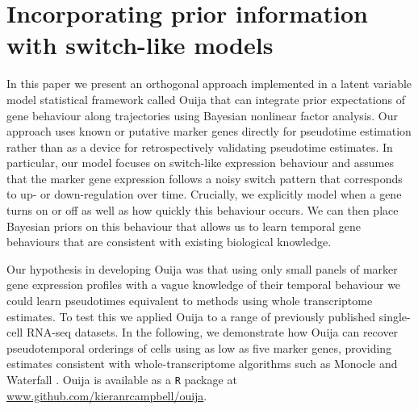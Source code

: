 \chapter{Incorporating prior information with switch-like models}\label{ch:ouijachap} %


In this paper we present an orthogonal approach implemented in a latent variable model statistical framework called Ouija that can integrate prior expectations of gene behaviour along trajectories using Bayesian nonlinear factor analysis. Our approach uses known or putative marker genes directly for pseudotime estimation rather than as a device for retrospectively validating pseudotime estimates. In particular, our model focuses on switch-like expression behaviour and assumes that the marker gene expression follows a noisy switch pattern that corresponds to up- or down-regulation over time. Crucially, we explicitly model when a gene turns on or off as well as how quickly this behaviour occurs. We can then place Bayesian priors on this behaviour that allows us to learn temporal gene behaviours that are consistent with existing biological knowledge.

Our hypothesis in developing Ouija was that using only small panels of marker gene expression profiles with a vague knowledge of their temporal behaviour we could learn pseudotimes equivalent to methods using whole transcriptome estimates. To test this we applied Ouija to a range of  previously published single-cell RNA-seq datasets. In the following, we demonstrate how Ouija can recover pseudotemporal orderings of cells using as low as five marker genes, providing estimates consistent with whole-transcriptome algorithms such as Monocle \cite{Trapnell2014} and Waterfall \cite{Shin2015}. Ouija is available as a \texttt{R} package at \url{www.github.com/kieranrcampbell/ouija}.

